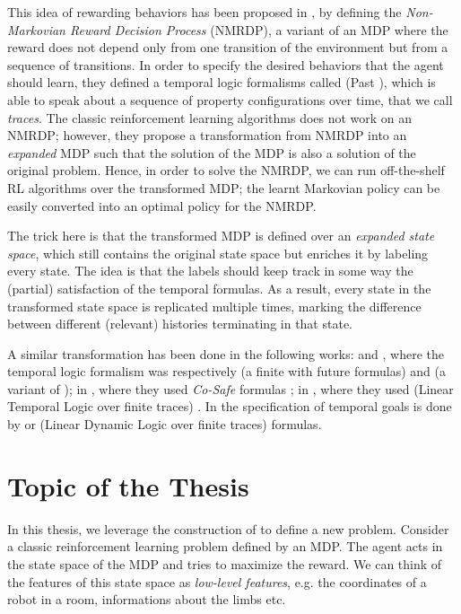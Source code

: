 This idea of rewarding behaviors has been proposed in \citep{bacchus1996rewarding}, by defining the \emph{Non-Markovian Reward Decision Process} (NMRDP), a variant of an MDP where the reward does not depend only from one transition of the environment but from a sequence of transitions. In order to specify the desired behaviors that the agent should learn, they defined a temporal logic formalisms called \PLTL (Past \LTL), which is able to speak about a sequence of property configurations over time, that we call \emph{traces}. The classic reinforcement learning algorithms does not work on an NMRDP; however, they propose a transformation from NMRDP into an \emph{expanded} MDP such that the solution of the MDP is also a solution of the original problem. Hence, in order to solve the NMRDP, we can run off-the-shelf RL algorithms over the transformed MDP; the learnt Markovian policy can be easily converted into an optimal policy for the NMRDP.

The trick here is that the transformed MDP is defined over an \emph{expanded state space}, which still contains the original state space but enriches it by labeling every state. The idea is that the labels should keep track in some way the (partial) satisfaction of the temporal formulas. As a result, every state in the transformed state space is replicated multiple times, marking the difference between different (relevant) histories terminating in that state.

\medskip
A similar transformation has been done in the following works: 
\citep{ThiebauxGSPK06} and \citep{gretton2014more}, where the temporal logic formalism was respectively \FLTL (a finite \LTL with future formulas) and \FstarLTL (a variant of \FLTL); 
in \citep{icarte2018teaching}, where they used \emph{Co-Safe} \LTL formulas \citep{Kupferman:2001:MCS:569028.569032, Lacerda:2015:OPG:2832415.2832470};
in \citep{CamachoCSM17, CamachoCSM17b}, where they used \LTLf (Linear Temporal Logic over finite traces) \citep{de2013linear}.
In \citep{AAAI1817342} the specification of temporal goals is done by \LTLf or \LDLf (Linear Dynamic Logic over finite traces) formulas.

\section{Topic of the Thesis}\label{sect:topic-thesis}
In this thesis, we leverage the construction of \citep{AAAI1817342} to define a new problem. Consider a classic reinforcement learning problem defined by an MDP. The agent acts in the state space of the MDP and tries to maximize the reward. We can think of the features of this state space as \emph{low-level features}, e.g. the coordinates of a robot in a room, informations about the limbs etc. 

